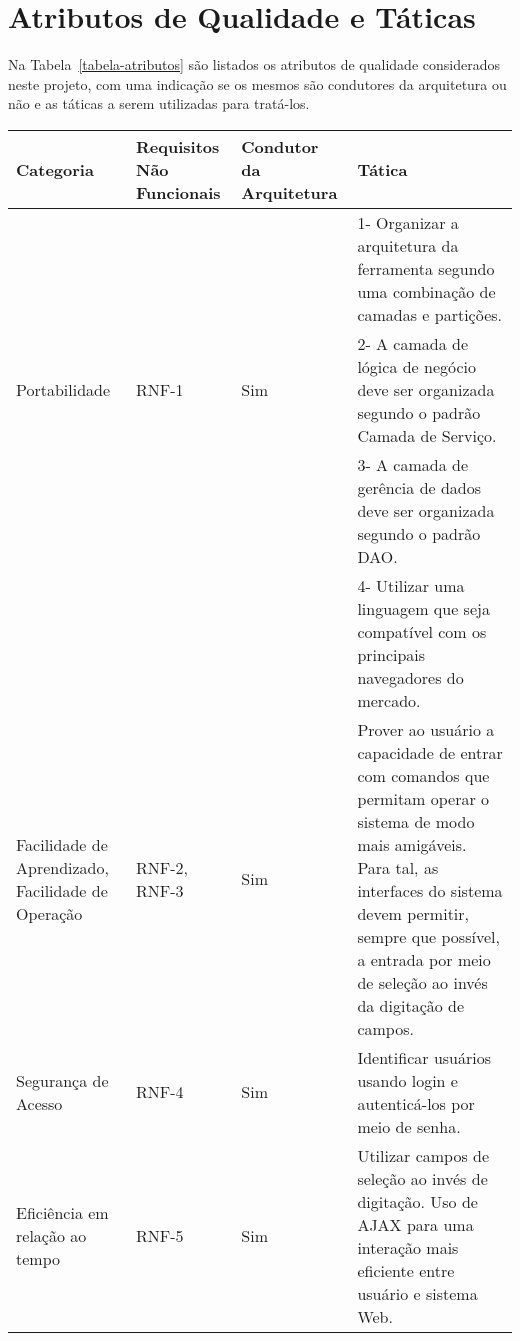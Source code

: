 \chapter{Atributos de Qualidade e Táticas}
\label{sec-atributos}

Na Tabela~\ref{tabela-atributos} são listados os atributos de qualidade considerados neste projeto, com uma indicação se os mesmos são condutores da arquitetura ou não e as táticas a serem utilizadas para tratá-los.


\begin{table}[h]
	\centering	
	\vspace{0.5cm}
	\begin{tabular}{|p{2.5cm}|p{2cm}|p{1.9cm}|p{8.4cm}|}  \hline \rowcolor[rgb]{0.8,0.8,0.8}
	
 		Categoria & Requisitos Não Funcionais & Condutor da Arquitetura & Tática \\\hline 
 		 
 		    
 		{} & {} & {} & 1- Organizar a arquitetura da ferramenta segundo uma combinação de camadas e partições.   \\
 		
 		Portabilidade & RNF-1 & Sim  & 2- A camada de lógica de negócio deve ser organizada segundo o padrão Camada de Serviço. \\
 		
		{} & {} & {} & 3- A camada de gerência de dados deve ser organizada segundo o padrão DAO. \\
 		  		
 		
 		{} & {} & {} & 4- Utilizar uma linguagem que seja compatível com os principais navegadores do mercado. \\ \hline  
 		  
 		                             
		Facilidade de Aprendizado, Facilidade de Operação & RNF-2, RNF-3 & Sim  & Prover ao usuário a capacidade de entrar com comandos que permitam operar o sistema de modo mais amigáveis. Para tal, as interfaces do sistema devem permitir, sempre que possível, a entrada por meio de seleção ao invés da digitação de campos. \\\hline
		
		
		Segurança de Acesso  & RNF-4 & Sim  & Identificar usuários usando login e autenticá-los por meio de senha. \\\hline
		  
		
		Eficiência em relação ao tempo & RNF-5 & Sim  & Utilizar campos de seleção ao invés de digitação. Uso de AJAX para uma interação mais eficiente entre usuário e sistema Web. \\\hline
	

\end{tabular}
\end{table}

